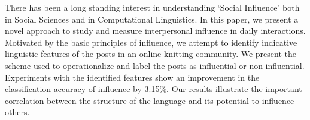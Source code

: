 There has been a long standing interest in understanding `Social Influence' both in Social Sciences and in Computational Linguistics. In this paper, we present a novel approach to study and measure interpersonal influence in daily interactions. Motivated by the basic principles of influence, we attempt to identify indicative linguistic features of the posts in an online knitting community. We present the scheme used to operationalize and label the posts as influential or non-influential. Experiments with the identified features show an improvement in the classification accuracy of influence by 3.15\%. Our results illustrate the important correlation between the structure of the language and its potential to influence others.
